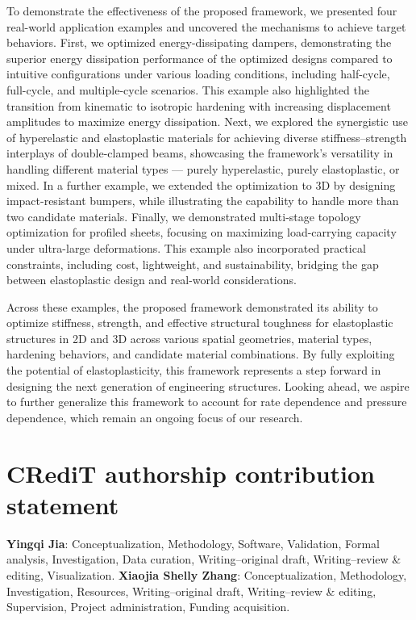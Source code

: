 \documentclass[preprint,11pt]{elsarticle}
\theoremstyle{definition}
\begin{document}
To demonstrate the effectiveness of the proposed framework, we presented four real-world application examples and uncovered the mechanisms to achieve target behaviors. First, we optimized energy-dissipating dampers, demonstrating the superior energy dissipation performance of the optimized designs compared to intuitive configurations under various loading conditions, including half-cycle, full-cycle, and multiple-cycle scenarios. This example also highlighted the transition from kinematic to isotropic hardening with increasing displacement amplitudes to maximize energy dissipation. Next, we explored the synergistic use of hyperelastic and elastoplastic materials for achieving diverse stiffness--strength interplays of double-clamped beams, showcasing the framework's versatility in handling different material types --- purely hyperelastic, purely elastoplastic, or mixed. In a further example, we extended the optimization to 3D by designing impact-resistant bumpers, while illustrating the capability to handle more than two candidate materials. Finally, we demonstrated multi-stage topology optimization for profiled sheets, focusing on maximizing load-carrying capacity under ultra-large deformations. This example also incorporated practical constraints, including cost, lightweight, and sustainability, bridging the gap between elastoplastic design and real-world considerations.

Across these examples, the proposed framework demonstrated its ability to optimize stiffness, strength, and effective structural toughness for elastoplastic structures in 2D and 3D across various spatial geometries, material types, hardening behaviors, and candidate material combinations. By fully exploiting the potential of elastoplasticity, this framework represents a step forward in designing the next generation of engineering structures. Looking ahead, we aspire to further generalize this framework to account for rate dependence and pressure dependence, which remain an ongoing focus of our research.


\section*{CRediT authorship contribution statement}
\textbf{Yingqi Jia}: Conceptualization, Methodology, Software, Validation, Formal analysis, Investigation, Data curation, Writing--original draft, Writing--review \& editing, Visualization. \textbf{Xiaojia Shelly Zhang}: Conceptualization, Methodology, Investigation, Resources, Writing--original draft, Writing--review \& editing, Supervision, Project administration, Funding acquisition.
\end{document}
